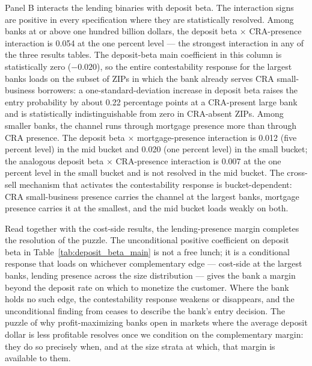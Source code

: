 Panel B interacts the lending binaries with deposit beta. The interaction signs are positive in every specification where they are statistically resolved. Among banks at or above one hundred billion dollars, the deposit beta $\times$ CRA-presence interaction is 0.054 at the one percent level --- the strongest interaction in any of the three results tables. The deposit-beta main coefficient in this column is statistically zero ($-0.020$), so the entire contestability response for the largest banks loads on the subset of ZIPs in which the bank already serves CRA small-business borrowers: a one-standard-deviation increase in deposit beta raises the entry probability by about 0.22 percentage points at a CRA-present large bank and is statistically indistinguishable from zero in CRA-absent ZIPs. Among smaller banks, the channel runs through mortgage presence more than through CRA presence. The deposit beta $\times$ mortgage-presence interaction is 0.012 (five percent level) in the mid bucket and 0.020 (one percent level) in the small bucket; the analogous deposit beta $\times$ CRA-presence interaction is 0.007 at the one percent level in the small bucket and is not resolved in the mid bucket. The cross-sell mechanism that activates the contestability response is bucket-dependent: CRA small-business presence carries the channel at the largest banks, mortgage presence carries it at the smallest, and the mid bucket loads weakly on both.

Read together with the cost-side results, the lending-presence margin completes the resolution of the puzzle. The unconditional positive coefficient on deposit beta in Table~\ref{tab:deposit_beta_main} is not a free lunch; it is a conditional response that loads on whichever complementary edge --- cost-side at the largest banks, lending presence across the size distribution --- gives the bank a margin beyond the deposit rate on which to monetize the customer. Where the bank holds no such edge, the contestability response weakens or disappears, and the unconditional finding from \citet{narayanan2025decline} ceases to describe the bank's entry decision. The puzzle of why profit-maximizing banks open in markets where the average deposit dollar is less profitable resolves once we condition on the complementary margin: they do so precisely when, and at the size strata at which, that margin is available to them.
